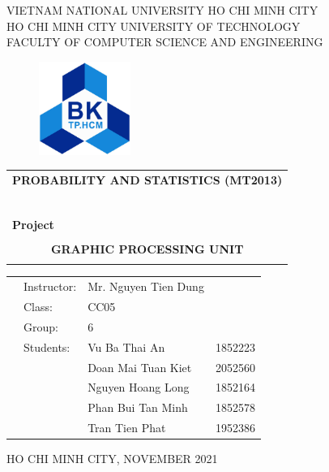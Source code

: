 \documentclass[a4paper]{article}
\begin{document}
\begin{titlepage}
\begin{center}
VIETNAM NATIONAL UNIVERSITY HO CHI MINH CITY\\
HO CHI MINH CITY UNIVERSITY OF TECHNOLOGY\\
FACULTY OF COMPUTER SCIENCE AND ENGINEERING
\end{center}

\vspace{1cm}

\begin{figure}[h!]
\begin{center}
\includegraphics[width=3cm]{LogoBK.jpg}
\end{center}
\end{figure}

\vspace{1cm}


\begin{center}
\begin{adjustbox}{width=\textwidth}
\begin{tabular}{c}
\multicolumn{1}{c}{\textbf{{\Large PROBABILITY AND STATISTICS (MT2013)}}}\\
~~\\
\hline
\\
\multicolumn{1}{l}{\textbf{{\Large Project}}}\\
\\
\textbf{{\Huge GRAPHIC PROCESSING UNIT}}\\
\\
\hline
\end{tabular}
\end{adjustbox}
\end{center}

\vspace{3cm}

\begin{table}[h]
\begin{tabular}{llll}
\hspace{5 cm} & Instructor: & Mr. Nguyen Tien Dung\\
& Class: & CC05\\
& Group: & 6\\
& Students: & Vu Ba Thai An & 1852223\\
&& Doan Mai Tuan Kiet & 2052560\\
&& Nguyen Hoang Long & 1852164\\
&& Phan Bui Tan Minh & 1852578\\
&& Tran Tien Phat & 1952386
\end{tabular}
\end{table}

\vspace*{1cm}

\begin{center}
{\footnotesize HO CHI MINH CITY, NOVEMBER 2021}
\end{center}
\end{titlepage}
\end{document}
